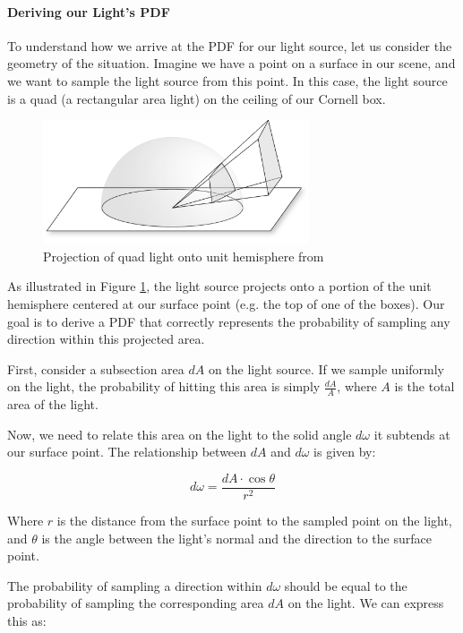 \documentclass[12pt]{article}
\begin{document}
\paragraph{Deriving our Light's PDF}

To understand how we arrive at the PDF for our light source, let us consider the geometry of the situation. Imagine we have a point on a surface in our scene, and we want to sample the light source from this point. In this case, the light source is a quad (a rectangular area light) on the ceiling of our Cornell box.

\begin{figure}[H]
    \centering
    \includegraphics[width=0.7\textwidth]{images/quad_projection.png}
    \caption{Projection of quad light onto unit hemisphere from  \cite{quadonsphereprojection} }
    \label{fig:quadprojection}
\end{figure}

As illustrated in Figure \ref{fig:quadprojection}, the light source projects onto a portion of the unit hemisphere centered at our surface point (e.g. the top of one of the boxes). Our goal is to derive a PDF that correctly represents the probability of sampling any direction within this projected area.

First, consider a subsection area $dA$ on the light source. If we sample uniformly on the light, the probability of hitting this area is simply $\frac{dA}{A}$, where $A$ is the total area of the light.

Now, we need to relate this area on the light to the solid angle $d\omega$ it subtends at our surface point. The relationship between $dA$ and $d\omega$ is given by:

$$d\omega = \frac{dA \cdot \cos\theta}{r^2}$$

Where $r$ is the distance from the surface point to the sampled point on the light, and $\theta$ is the angle between the light's normal and the direction to the surface point.

The probability of sampling a direction within $d\omega$ should be equal to the probability of sampling the corresponding area $dA$ on the light. We can express this as:
\end{document}
